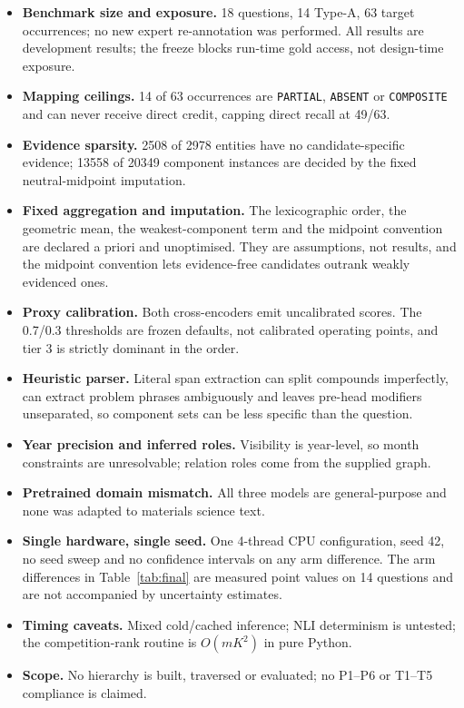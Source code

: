 \documentclass[11pt,a4paper]{article}
\begin{document}
\begin{itemize}
\item \textbf{Benchmark size and exposure.} 18 questions, 14 Type-A, 63 target occurrences; no new expert re-annotation was performed. All results are development results; the freeze blocks run-time gold access, not design-time exposure.
\item \textbf{Mapping ceilings.} 14 of 63 occurrences are \texttt{PARTIAL}, \texttt{ABSENT} or \texttt{COMPOSITE} and can never receive direct credit, capping direct recall at 49/63.
\item \textbf{Evidence sparsity.} 2508 of 2978 entities have no candidate-specific evidence; 13558 of 20349 component instances are decided by the fixed neutral-midpoint imputation.
\item \textbf{Fixed aggregation and imputation.} The lexicographic order, the geometric mean, the weakest-component term and the midpoint convention are declared a priori and unoptimised. They are assumptions, not results, and the midpoint convention lets evidence-free candidates outrank weakly evidenced ones.
\item \textbf{Proxy calibration.} Both cross-encoders emit uncalibrated scores. The 0.7/0.3 thresholds are frozen defaults, not calibrated operating points, and tier 3 is strictly dominant in the order.
\item \textbf{Heuristic parser.} Literal span extraction can split compounds imperfectly, can extract problem phrases ambiguously and leaves pre-head modifiers unseparated, so component sets can be less specific than the question.
\item \textbf{Year precision and inferred roles.} Visibility is year-level, so month constraints are unresolvable; relation roles come from the supplied graph.
\item \textbf{Pretrained domain mismatch.} All three models are general-purpose and none was adapted to materials science text.
\item \textbf{Single hardware, single seed.} One 4-thread CPU configuration, seed 42, no seed sweep and no confidence intervals on any arm difference. The arm differences in Table~\ref{tab:final} are measured point values on 14 questions and are not accompanied by uncertainty estimates.
\item \textbf{Timing caveats.} Mixed cold/cached inference; NLI determinism is untested; the competition-rank routine is $O(mK^2)$ in pure Python.
\item \textbf{Scope.} No hierarchy is built, traversed or evaluated; no P1--P6 or T1--T5 compliance is claimed.
\end{itemize}
\end{document}
